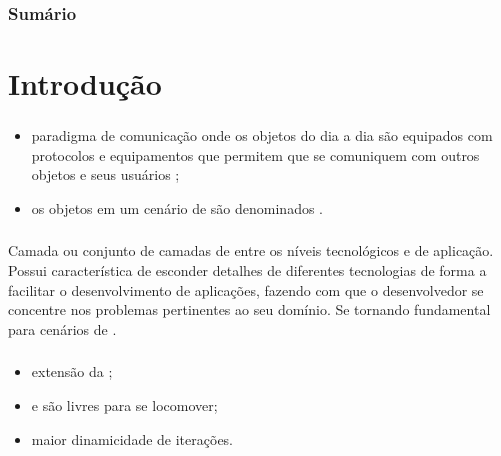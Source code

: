 \documentclass[aspectratio=169]{beamer}
\begin{document}
\frame{\titlepage}

\begin{frame}
	\frametitle{Sumário}
	\tableofcontents
\end{frame}


\section{Introdução}


\begin{frame}
	\frametitle{\iot}
	\begin{itemize}
		\item paradigma de comunicação onde os objetos do dia a dia são equipados com protocolos e equipamentos que permitem que se comuniquem com outros objetos e seus usuários \cite{atzori:iera:morabito:2010};

			\bigskip

		\item os objetos em um cenário de \iot são denominados \smartobjs.
	\end{itemize}
\end{frame}

\begin{frame}
	\frametitle{\Middleware}
	Camada ou conjunto de camadas de \software entre os níveis tecnológicos e de aplicação.
	Possui característica de esconder detalhes de diferentes tecnologias de forma a facilitar o desenvolvimento de aplicações, fazendo com que o desenvolvedor se concentre nos problemas pertinentes ao seu domínio.
	Se tornando fundamental para cenários de \iot \cite{atzori:iera:morabito:2010}.
\end{frame}

\begin{frame}
	\frametitle{\iomt}
	\begin{itemize}
		\item extensão da \iot;

			\bigskip
			
		\item \smartobjs e \textbf{\gateways} são livres para se locomover;

			\bigskip

		\item maior dinamicidade de iterações.
	\end{itemize}
\end{frame}
\end{document}
